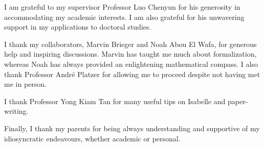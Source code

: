 
I am grateful to my supervisor Professor Luo Chenyun for his generosity in accommodating my academic interests. I am also grateful for his unwavering support in my applications to doctoral studies.

I thank my collaborators, Marvin Brieger and Noah Abou El Wafa, for generous help and inspiring discussions. Marvin has taught me much about formalization, whereas Noah has always provided an enlightening mathematical compass. I also thank Professor André Platzer for allowing me to proceed despite not having met me in person.

I thank Professor Yong Kiam Tan for many useful tips on Isabelle and paper-writing.

Finally, I thank my parents for being always understanding and supportive of my idiosyncratic endeavours, whether academic or personal.